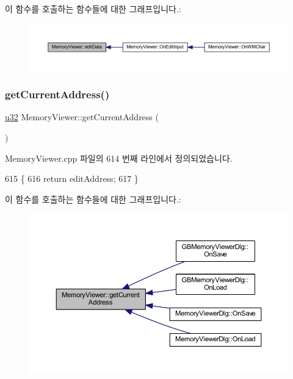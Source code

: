 이 함수를 호출하는 함수들에 대한 그래프입니다.\+:
\nopagebreak
\begin{figure}[H]
\begin{center}
\leavevmode
\includegraphics[width=350pt]{class_memory_viewer_a07778cf336e9f145a6403849407fb72d_icgraph}
\end{center}
\end{figure}
\mbox{\label{class_memory_viewer_a7c3931c2a0b1247e4a093a1688d443bf}} 
\subsubsection{\texorpdfstring{get\+Current\+Address()}{getCurrentAddress()}}
{\footnotesize\ttfamily \mbox{\hyperlink{_system_8h_a10e94b422ef0c20dcdec20d31a1f5049}{u32}} Memory\+Viewer\+::get\+Current\+Address (\begin{DoxyParamCaption}{ }\end{DoxyParamCaption})}



Memory\+Viewer.\+cpp 파일의 614 번째 라인에서 정의되었습니다.


\begin{DoxyCode}
615 \{
616   \textcolor{keywordflow}{return} editAddress;
617 \}
\end{DoxyCode}
이 함수를 호출하는 함수들에 대한 그래프입니다.\+:
\nopagebreak
\begin{figure}[H]
\begin{center}
\leavevmode
\includegraphics[width=350pt]{class_memory_viewer_a7c3931c2a0b1247e4a093a1688d443bf_icgraph}
\end{center}
\end{figure}
\mbox{\label{class_memory_viewer_a288ec6d61ae8687974786bf8d04a4e77}} 
